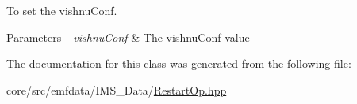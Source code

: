 To set the vishnuConf. 


\begin{DoxyParams}{Parameters}
{\em \_\-vishnuConf} & The vishnuConf value \\
\hline
\end{DoxyParams}


The documentation for this class was generated from the following file:\begin{DoxyCompactItemize}
\item 
core/src/emfdata/IMS\_\-Data/\hyperlink{RestartOp_8hpp}{RestartOp.hpp}\end{DoxyCompactItemize}
